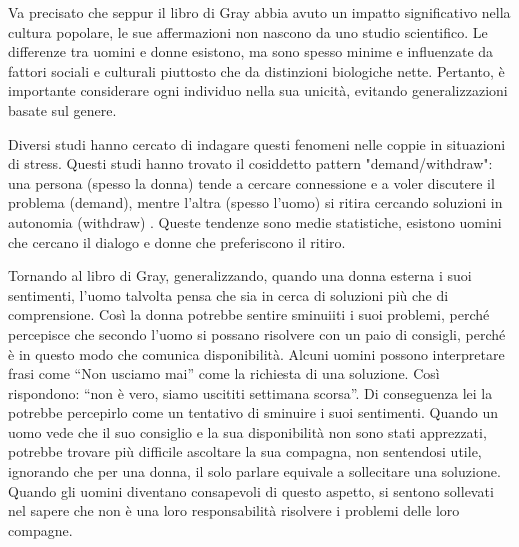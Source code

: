 \documentclass[12pt]{book} %
\begin{document}
Va precisato che seppur il libro di Gray abbia avuto un impatto significativo nella cultura popolare, le sue affermazioni non nascono da uno studio scientifico. Le differenze tra uomini e donne esistono, ma sono spesso minime e influenzate da fattori sociali e culturali piuttosto che da distinzioni biologiche nette. Pertanto, è importante considerare ogni individuo nella sua unicità, evitando generalizzazioni basate sul genere.

Diversi studi hanno cercato di indagare questi fenomeni nelle coppie in situazioni di stress. Questi studi hanno trovato il cosiddetto pattern "demand/withdraw": una persona (spesso la donna) tende a cercare connessione e a voler discutere il problema (demand), mentre l’altra (spesso l’uomo) si ritira cercando soluzioni in autonomia (withdraw)   . Queste tendenze sono medie statistiche, esistono uomini che cercano il dialogo e donne che preferiscono il ritiro.

Tornando al libro di Gray, generalizzando, quando una donna esterna i suoi sentimenti, l'uomo talvolta pensa che sia in cerca di soluzioni più che di
comprensione. Così la donna potrebbe sentire sminuiiti i suoi problemi, perché percepisce che secondo l'uomo si possano risolvere con un paio di consigli, perché è in questo modo che comunica disponibilità. 
Alcuni uomini possono interpretare frasi come “Non usciamo mai” come la richiesta di una soluzione. 
Così rispondono: “non è vero, siamo uscititi settimana scorsa”. Di conseguenza lei la potrebbe percepirlo come un tentativo di sminuire i suoi sentimenti. Quando un uomo vede che il suo consiglio e la sua disponibilità non sono stati apprezzati, potrebbe trovare più difficile ascoltare la sua compagna, non sentendosi utile, ignorando che per una donna, il solo parlare equivale a sollecitare una soluzione.
Quando gli uomini diventano consapevoli di questo aspetto, si sentono sollevati nel sapere che non è una loro responsabilità risolvere i problemi delle loro compagne. 
\end{document}
